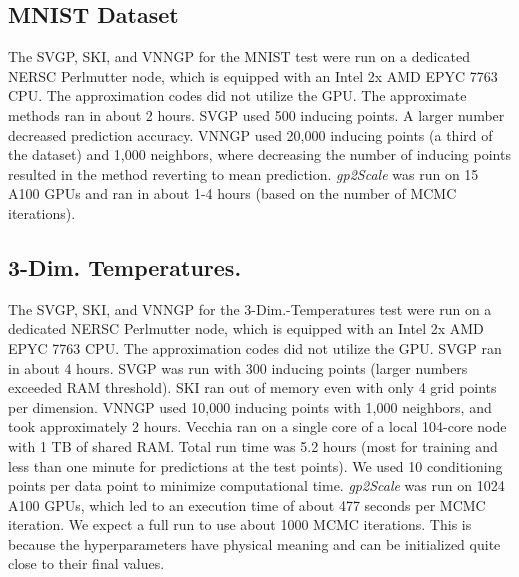 \documentclass{article}
\begin{document}
\subsection{MNIST Dataset}
The SVGP, SKI, and VNNGP for the MNIST test were run on a dedicated NERSC Perlmutter node, which is equipped with an Intel 2x AMD EPYC 7763  CPU. The approximation codes did not utilize the GPU. The approximate methods ran in about 2 hours. 
SVGP used 500 inducing points. A larger number decreased prediction accuracy. VNNGP used 20,000 inducing points (a third of the dataset) and 1,000 neighbors, where decreasing the number of inducing points resulted in the method reverting to mean prediction.
\emph{gp2Scale} was run on 15 A100 GPUs and ran in about 1-4 hours (based on the number of MCMC iterations).



\subsection{3-Dim. Temperatures.}
The SVGP, SKI, and VNNGP for the 3-Dim.-Temperatures test were run on a dedicated NERSC Perlmutter node, which is equipped with an Intel 2x AMD EPYC 7763  CPU. The approximation codes did not utilize the GPU. 
SVGP ran in about 4 hours. 
SVGP was run with 300 inducing points (larger numbers exceeded RAM threshold). SKI ran out of memory even with only 4 grid points per dimension. VNNGP used 10,000 inducing points with 1,000 neighbors, and took approximately 2 hours. Vecchia ran on a single core of a local 104-core node with 1 TB of shared RAM. Total run time was 5.2 hours (most for training and less than one minute for predictions at the test points). We used 10 conditioning points per data point to minimize computational time.
\emph{gp2Scale} was run on 1024 A100 GPUs, which led to an execution time of about 477 seconds per MCMC iteration. We expect a full run to use about 1000 MCMC iterations. This is because the hyperparameters have physical meaning and can be initialized quite close to their final values. 
\end{document}
